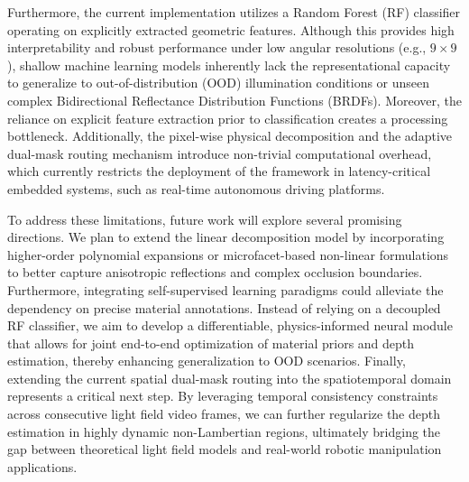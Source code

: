 Furthermore, the current implementation utilizes a Random Forest (RF) classifier operating on explicitly extracted geometric features. Although this provides high interpretability and robust performance under low angular resolutions (e.g., $9 \times 9$), shallow machine learning models inherently lack the representational capacity to generalize to out-of-distribution (OOD) illumination conditions or unseen complex Bidirectional Reflectance Distribution Functions (BRDFs). Moreover, the reliance on explicit feature extraction prior to classification creates a processing bottleneck. Additionally, the pixel-wise physical decomposition and the adaptive dual-mask routing mechanism introduce non-trivial computational overhead, which currently restricts the deployment of the framework in latency-critical embedded systems, such as real-time autonomous driving platforms.

To address these limitations, future work will explore several promising directions. We plan to extend the linear decomposition model by incorporating higher-order polynomial expansions or microfacet-based non-linear formulations to better capture anisotropic reflections and complex occlusion boundaries. Furthermore, integrating self-supervised learning paradigms could alleviate the dependency on precise material annotations. Instead of relying on a decoupled RF classifier, we aim to develop a differentiable, physics-informed neural module that allows for joint end-to-end optimization of material priors and depth estimation, thereby enhancing generalization to OOD scenarios. Finally, extending the current spatial dual-mask routing into the spatiotemporal domain represents a critical next step. By leveraging temporal consistency constraints across consecutive light field video frames, we can further regularize the depth estimation in highly dynamic non-Lambertian regions, ultimately bridging the gap between theoretical light field models and real-world robotic manipulation applications.